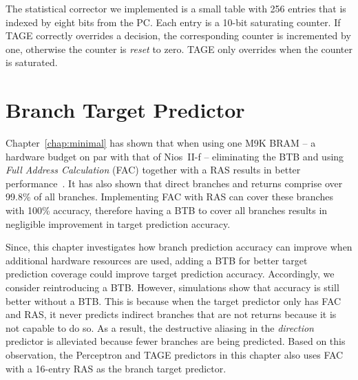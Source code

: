 The statistical corrector we implemented is a small table with 256 entries that is indexed by eight bits from the PC. Each entry is a 10-bit saturating counter. If TAGE correctly overrides a decision, the corresponding counter is incremented by one, otherwise the counter is \textit{reset} to zero. TAGE only overrides when the counter is saturated.


\section{Branch Target Predictor}
\label{sec:advanced:target}
Chapter~\ref{chap:minimal} has shown that when using one M9K BRAM -- a hardware budget on par with that of Nios~II-f -- eliminating the BTB and using \textit{Full Address Calculation} (FAC) together with a RAS results in better performance~\cite{grselect}. It has also shown that direct branches and returns comprise over 99.8\% of all branches. Implementing FAC with RAS can cover these branches with 100\% accuracy, therefore having a BTB to cover all branches results in negligible improvement in target prediction accuracy.

Since, this chapter investigates how branch prediction accuracy can improve when additional hardware resources are used, adding a BTB for better target prediction coverage could improve target prediction accuracy. Accordingly, we consider reintroducing a BTB. However, simulations show that accuracy is still better without a BTB. This is because when the target predictor only has FAC and RAS, it never predicts indirect branches that are not returns because it is not capable to do so. As a result, the destructive aliasing in the \textit{direction} predictor is alleviated because fewer branches are being predicted. Based on this observation, the Perceptron and TAGE predictors in this chapter also uses FAC with a 16-entry RAS as the branch target predictor.



